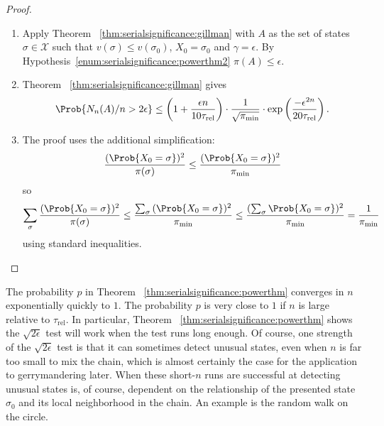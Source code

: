 \documentclass[12pt]{article}
\begin{document}
\begin{proof}
    \begin{enumerate}
        \item
            Apply Theorem~%
            \ref{thm:serialsignificance:gillman} with \( A \) as the set
            of states \( \sigma \in \mathcal{X} \) such that \( v(\sigma)
            \le v(\sigma_0) \), \( X_0 = \sigma_0 \) and \( \gamma =
            \epsilon \).  By
            Hypothesis~\ref{enum:serialsignificance:powerthm2}
            \( \pi(A) \le \epsilon \).
        \item
            Theorem~%
            \ref{thm:serialsignificance:gillman} gives
            \[
                \Prob{N_{n}(A)/n > 2\epsilon} \le \left( 1 + \frac{\epsilon
                n}{10 \tau_{\text{rel}}} \right) \cdot \frac{1}{\sqrt{\pi_
                {\min}}} \cdot \exp \left( \frac{-\epsilon^{2 n}}{20
                \tau_{\text{rel}}} \right).
            \]
        \item
            The proof uses the additional simplification:
            \[
                \frac{(\Prob{X_0 = \sigma})^2}{\pi (\sigma)} \le \frac{(\Prob
                {X_0 = \sigma})^2}{\pi_{\min}}
            \] so
            \[
                \sum_{\sigma} \frac{(\Prob{X_0 =\sigma})^2}{\pi (\sigma)}
                \le \frac{\sum_{\sigma}{(\Prob{X_0 =\sigma})^2}}{\pi_{\min}}
                \le \frac{(\sum_{\sigma}\Prob{X_0 =\sigma})^2}{\pi_{\min}}
                = \frac{1}{\pi_{\min}}
            \] using standard inequalities.
    \end{enumerate}
\end{proof}

\begin{remark}
    The probability \( p \) in Theorem~%
    \ref{thm:serialsignificance:powerthm} converges in \( n \)
    exponentially quickly to \( 1 \).  The probability \( p \) is very
    close to \( 1 \) if \( n \) is large relative to \( \tau_{\text {rel}}
    \).  In particular, Theorem~%
    \ref{thm:serialsignificance:powerthm} shows the \( \sqrt{2\epsilon} \)
    test will work when the test runs long enough.  Of course, one
    strength of the \( \sqrt{2\epsilon} \) test is that it can sometimes
    detect unusual states, even when \( n \) is far too small to mix the
    chain, which is almost certainly the case for the application to
    gerrymandering later.  When these short-\( n \) runs are successful
    at detecting unusual states is, of course, dependent on the
    relationship of the presented state \( \sigma_0 \) and its local
    neighborhood in the chain.  An example is the random walk on the
    circle.
\end{remark}
\end{document}
